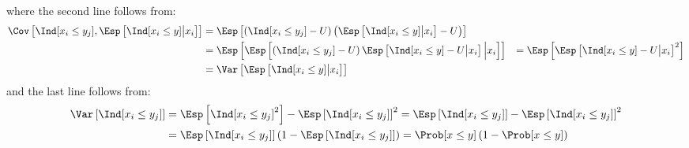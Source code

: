 \documentclass[12pt]{article}
\begin{document}
where the second line follows from:
\begin{align*}
\Cov\left[\Ind[x_i \leq y_j],\Esp\left[ \Ind[x_i \leq y] \big| x_i\right]\right] &= \Esp\left[\left(\Ind[x_i \leq y_j] - U\right)\left(\Esp\left[ \Ind[x_i \leq y] \big| x_i\right]-U\right)\right] \\
&= \Esp\left[\Esp\left[\left(\Ind[x_i \leq y_j] - U\right)\Esp\left[ \Ind[x_i \leq y]-U \big| x_i\right]\Big| x_i \right] \right] 
&= \Esp\left[\Esp\left[ \Ind[x_i \leq y]-U \big| x_i\right]^2 \right] \\
&= \Var\left[\Esp\left[\Ind[x_i \leq y] \big| x_i\right] \right] 
\end{align*}
and the last line follows from:
\begin{align*}
\Var\left[\Ind[x_i \leq y_j]\right] &= \Esp\left[\Ind[x_i \leq y_j]^2\right] - \Esp\left[\Ind[x_i \leq y_j]\right]^2 
= \Esp\left[\Ind[x_i \leq y_j]\right] - \Esp\left[\Ind[x_i \leq y_j]\right]^2 \\
&= \Esp\left[\Ind[x_i \leq y_j]\right]\left(1 - \Esp\left[\Ind[x_i \leq y_j]\right]\right)
= \Prob[x \leq y]\left(1 - \Prob[x \leq y]\right)
\end{align*}
\end{document}
